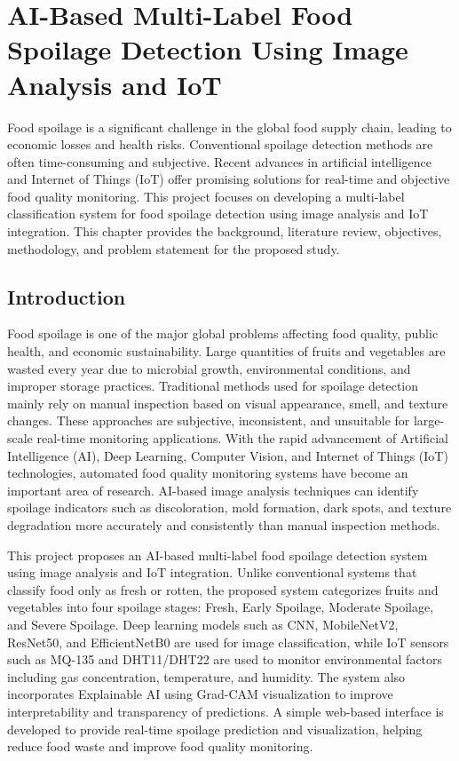 \chapter{AI-Based Multi-Label Food Spoilage Detection Using Image Analysis and IoT}
 Food spoilage is a significant challenge in the global food supply chain, leading to economic losses and health risks. Conventional spoilage detection methods are often time-consuming and subjective. Recent advances in artificial intelligence and Internet of Things (IoT) offer promising solutions for real-time and objective food quality monitoring. This project focuses on developing a multi-label classification system for food spoilage detection using image analysis and IoT integration. This chapter provides the background, literature review, objectives, methodology, and problem statement for the proposed study.

\section[Introduction]{\textbf{Introduction}}
Food spoilage is one of the major global problems affecting food quality, public health, and economic sustainability. Large quantities of fruits and vegetables are wasted every year due to microbial growth, environmental conditions, and improper storage practices. Traditional methods used for spoilage detection mainly rely on manual inspection based on visual appearance, smell, and texture changes. These approaches are subjective, inconsistent, and unsuitable for large-scale real-time monitoring applications. With the rapid advancement of Artificial Intelligence (AI), Deep Learning, Computer Vision, and Internet of Things (IoT) technologies, automated food quality monitoring systems have become an important area of research. AI-based image analysis techniques can identify spoilage indicators such as discoloration, mold formation, dark spots, and texture degradation more accurately and consistently than manual inspection methods.

This project proposes an AI-based multi-label food spoilage detection system using image analysis and IoT integration. Unlike conventional systems that classify food only as fresh or rotten, the proposed system categorizes fruits and vegetables into four spoilage stages: Fresh, Early Spoilage, Moderate Spoilage, and Severe Spoilage. Deep learning models such as CNN, MobileNetV2, ResNet50, and EfficientNetB0 are used for image classification, while IoT sensors such as MQ-135 and DHT11/DHT22 are used to monitor environmental factors including gas concentration, temperature, and humidity. The system also incorporates Explainable AI using Grad-CAM visualization to improve interpretability and transparency of predictions. A simple web-based interface is developed to provide real-time spoilage prediction and visualization, helping reduce food waste and improve food quality monitoring.

